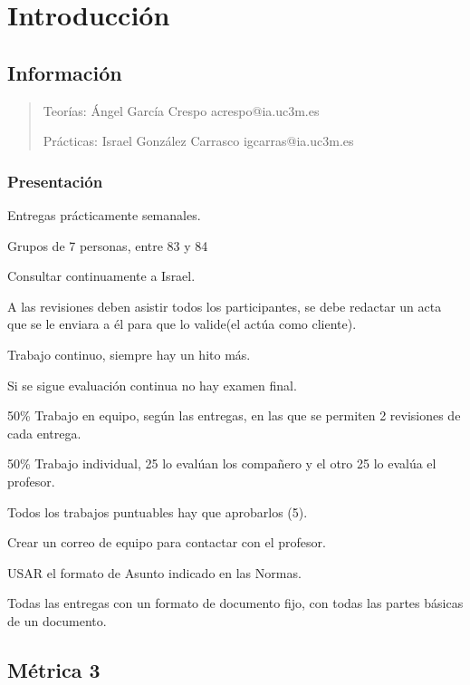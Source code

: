 \documentclass[12pt]{report} %
\begin{document}
\clearpage
{} %



\part{Introducción}

\chapter{Información}

\begin{quote}
Teorías: Ángel García Crespo acrespo@ia.uc3m.es

Prácticas: Israel González Carrasco igcarras@ia.uc3m.es
\end{quote}

\section{Presentación}

Entregas prácticamente semanales.

Grupos de 7 personas, entre 83 y 84

Consultar continuamente a Israel.

A las revisiones deben asistir todos los participantes, se debe redactar
un acta que se le enviara a él para que lo valide(el actúa como
cliente).

Trabajo continuo, siempre hay un hito más.

Si se sigue evaluación continua no hay examen final.

50\% Trabajo en equipo, según las entregas, en las que se permiten 2
revisiones de cada entrega.

50\% Trabajo individual, 25 lo evalúan los compañero y el otro 25 lo
evalúa el profesor.

Todos los trabajos puntuables hay que aprobarlos (5).

Crear un correo de equipo para contactar con el profesor.

USAR el formato de Asunto indicado en las Normas.

Todas las entregas con un formato de documento fijo, con todas las
partes básicas de un documento.

\chapter{Métrica 3}
\end{document}
